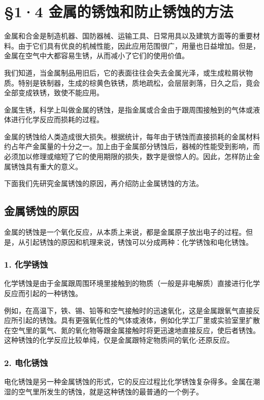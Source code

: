 \section{§1·4 金属的锈蚀和防止锈蚀的方法}

金属和合金是制造机器、国防器械、运输工具、日常用具以及建筑方面等的重要材料。由于它们具有优良的机械性能，因此应用范围很广，用量也日益增加。但是，金属在空气中大都容易生锈，从而减小了它们的使用价值。

我们知道，当金属制品用旧后，它的表面往往会失去金属光泽，或生成粒屑状物质。特别是铁制器，生成的棕黄色铁锈，质地疏松，会层层剥落，日久之后，竟会全部变成铁锈，致使不能应用。

金属生锈，科学上叫做金属的锈蚀，是指金属或合金由于跟周围接触到的气体或液体进行化学反应而损耗的过程。

金属的锈蚀给人类造成很大损失。根据统计，每年由于锈蚀而直接损耗的金属材料约占年产金属量的十分之一。加上由于金属部分锈蚀后，器械的性能受到影响，而必须加以修理或缩短了它的使用期限的损失，数字是很惊人的。因此，怎样防止金属锈蚀具有重大的意义。

下面我们先研究金属锈蚀的原因，再介绍防止金属锈蚀的方法。

\subsection{金属锈蚀的原因}

金属的锈蚀是一个氧化反应，从本质上来说，都是金属原子放出电子的过程。但是，从引起锈蚀的原因和机理来说，锈蚀可以分成两种：化学锈蚀和电化锈蚀。

\subsubsection{1. 化学锈蚀}

化学锈蚀是由于金属跟周围环境里接触到的物质（一般是非电解质）直接进行化学反应而引起的一种锈蚀。

例如，在高温下，铁、锡、铅等和空气接触时的迅速氧化，这是金属跟氧气直接反应所引起的锈蚀。具有更强氧化性的气体或液体，例如化学工厂里或实验室里扩散在空气里的氯气、氮的氧化物等跟金属接触时将更迅速地直接反应，使后者锈蚀。这种锈蚀的化学反应比较单纯，仅是金属跟特定物质间的氧化-还原反应。

\subsubsection{2. 电化锈蚀}

电化锈蚀是另一种金属锈蚀的形式，它的反应过程比化学锈蚀复杂得多。金属在潮湿的空气里所发生的锈蚀，就是这种锈蚀的最普通的一个例子。

